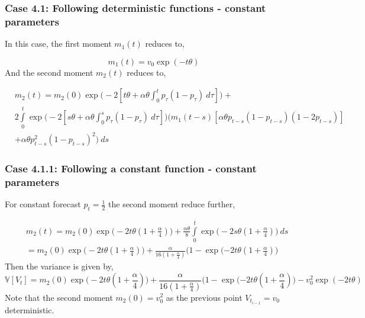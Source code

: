 \documentclass[aspectratio=169]{beamer}\usepackage[utf8]{inputenc}
\newcommand{\V}{\mathbb{V}}
\begin{document}
\begin{frame}\frametitle{ Case 4.1: Following deterministic functions - constant parameters }
In this case, the first moment  $m_1(t)$ reduces to, 

\begin{equation}
m_1(t) = v_0 \exp ( -t\theta ) 
\end{equation}
And the second moment $m_2(t)$ reduces to,

\begin{equation*}
\begin{split}
&m_{2}(t) = m_{2}(0) \exp \Big( -2  [t \theta + \alpha \theta \int_0^t    p_\tau (1-p_\tau)  \ d\tau ] \Big) + \\
& 2 \int\limits_{0}^{t}    \exp \Big( -2 [s \theta + \alpha \theta \int_0^s    p_\tau (1-p_\tau)  \ d\tau ] \Big) \Big( m_{1}(t-s)[\alpha \theta p_{t-s} (1-p_{t-s}) (1-2p_{t-s})]  \\
& + \alpha \theta p_{t-s}^2(1-p_{t-s})^2  \Big) \  ds
\end{split}
\end{equation*}


\end{frame}


\begin{frame}\frametitle{ Case 4.1.1: Following a constant function - constant parameters }
For constant forecast $p_t = \frac{1}{2}$ the second moment reduce further, 

\begin{equation*}
\begin{split}
&m_{2}(t) = m_{2}(0) \exp \Big( -2 t \theta (1 + \frac{\alpha }{4} ) \Big) +   \frac{\alpha \theta}{8} \int\limits_{0}^{t}  \exp \Big( -2 s \theta (1 + \frac{\alpha }{4} )\Big) \  ds \\
& =m_{2}(0) \exp \Big( -2 t \theta (1 + \frac{\alpha }{4} ) \Big) + \frac{\alpha }{16 (1+ \frac{\alpha}{4})} \Big(1- \exp ( -2 t \theta (1 + \frac{\alpha }{4} ) \Big) 
\end{split}
\end{equation*}
Then the variance is given by,
\begin{equation}
\V[V_t] =m_{2}(0) \exp \Big( -2 t \theta (1 + \frac{\alpha }{4} ) \Big) + \frac{\alpha }{16 (1+ \frac{\alpha}{4})} \Big(1- \exp ( -2 t \theta (1 + \frac{\alpha }{4} ) \Big)   - v_0^2 \exp ( -2t\theta ) 
\end{equation}
Note that the second moment $m_2(0)=v_0^2$ as the previous point $V_{t_{i-1}}=v_0$ deterministic.
\end{frame}
\end{document}
